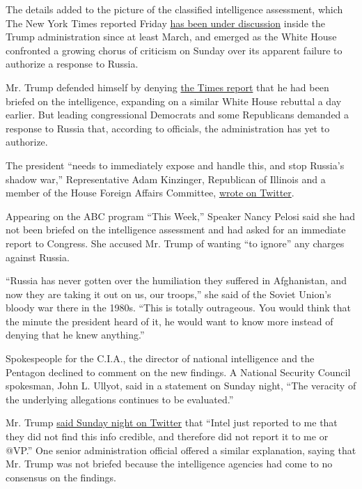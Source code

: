 The details added to the picture of the classified intelligence
assessment, which The New York Times reported Friday
\href{https://www.nytimes.com/2020/06/26/us/politics/russia-afghanistan-bounties.html}{has
been under discussion} inside the Trump administration since at least
March, and emerged as the White House confronted a growing chorus of
criticism on Sunday over its apparent failure to authorize a response to
Russia.

Mr. Trump defended himself by denying
\href{https://www.nytimes.com/2020/06/26/us/politics/russia-afghanistan-bounties.html}{the
Times report} that he had been briefed on the intelligence, expanding on
a similar White House rebuttal a day earlier. But leading congressional
Democrats and some Republicans demanded a response to Russia that,
according to officials, the administration has yet to authorize.

The president ``needs to immediately expose and handle this, and stop
Russia's shadow war,'' Representative Adam Kinzinger, Republican of
Illinois and a member of the House Foreign Affairs Committee,
\href{https://twitter.com/RepKinzinger/status/1276647856133332994}{wrote
on Twitter}.

Appearing on the ABC program ``This Week,'' Speaker Nancy Pelosi said
she had not been briefed on the intelligence assessment and had asked
for an immediate report to Congress. She accused Mr. Trump of wanting
``to ignore'' any charges against Russia.

``Russia has never gotten over the humiliation they suffered in
Afghanistan, and now they are taking it out on us, our troops,'' she
said of the Soviet Union's bloody war there in the 1980s. ``This is
totally outrageous. You would think that the minute the president heard
of it, he would want to know more instead of denying that he knew
anything.''

Spokespeople for the C.I.A., the director of national intelligence and
the Pentagon declined to comment on the new findings. A National
Security Council spokesman, John L. Ullyot, said in a statement on
Sunday night, ``The veracity of the underlying allegations continues to
be evaluated.''

Mr. Trump
\href{https://twitter.com/realDonaldTrump/status/1277431695248183298?s=20}{said
Sunday night on Twitter} that ``Intel just reported to me that they did
not find this info credible, and therefore did not report it to me or
@VP.'' One senior administration official offered a similar explanation,
saying that Mr. Trump was not briefed because the intelligence agencies
had come to no consensus on the findings.

